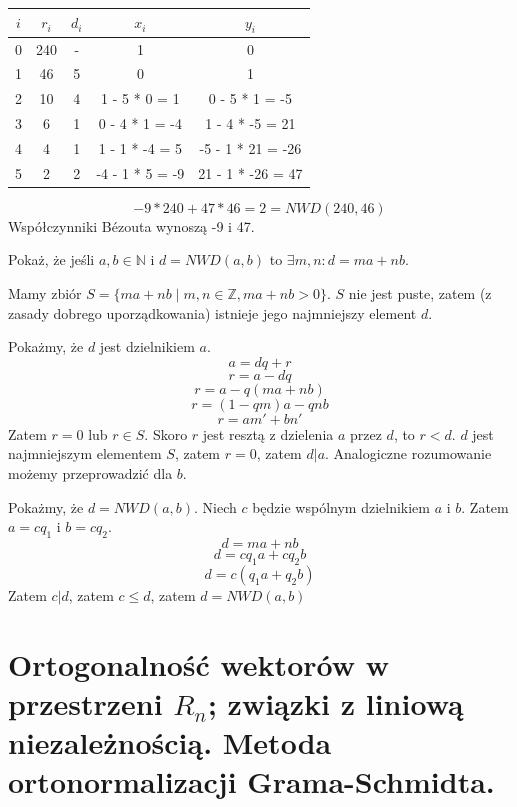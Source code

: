 \documentclass[12pt]{article}
\begin{document}
    \begin{table}[H]
    \centering
    \begin{tabular}{|c|c|c|c|c|}
    \hline
    $i$ &  $r_i$& $d_i$ &       $x_i$   &       $y_i$       \\
    \hline
    0   &   240 &   -   &       1       &       0           \\
    \hline
    1   &   46  &   5   &       0       &       1           \\
    \hline
    2   &   10  &   4   & 1 - 5 * 0 = 1 & 0 - 5 * 1 = -5    \\
    \hline
    3   &   6   &   1   & 0 - 4 * 1 = -4& 1 - 4 * -5 = 21   \\
    \hline
    4   &   4   &   1   & 1 - 1 * -4 = 5& -5 - 1 * 21 = -26 \\
    \hline
    5   &   2   &   2   &-4 - 1 * 5 = -9& 21 - 1 * -26 = 47 \\
    \hline
    
    \end{tabular}
    \end{table}
    
    $$-9 * 240 + 47 * 46 = 2 = NWD(240, 46)$$
    Współczynniki Bézouta wynoszą -9 i 47.\\
    
    \begin{exercise}
    Pokaż, że jeśli $a, b \in \mathbb{N}$ i $d = NWD(a, b)$ to $\exists m, n : d = ma + nb$.
    \end{exercise}
    
    Mamy zbiór $S = \{ma + nb \; | \; m, n \in \mathbb{Z}, ma + nb > 0\}$. $S$ nie jest puste, zatem (z zasady dobrego uporządkowania) istnieje jego najmniejszy element $d$.
    
    Pokażmy, że $d$ jest dzielnikiem $a$.
    $$a = dq + r$$
    $$r = a - dq$$
    $$r = a - q(ma + nb)$$
    $$r = (1 - qm)a - qnb$$
    $$r = am' + bn'$$
    Zatem $r = 0$ lub $r \in S$. Skoro $r$ jest resztą z dzielenia $a$ przez $d$, to $r < d$. $d$ jest najmniejszym elementem $S$, zatem $r = 0$, zatem $d | a$. Analogiczne rozumowanie możemy przeprowadzić dla $b$.
    
    Pokażmy, że $d = NWD(a, b)$. Niech $c$ będzie wspólnym dzielnikiem $a$ i $b$. Zatem $a = cq_1$ i $b = cq_2$.
    $$d = ma + nb$$
    $$d = cq_1a + cq_2b$$
    $$d = c(q_1a + q_2b)$$
    Zatem $c | d$, zatem $c \leq d$, zatem $d = NWD(a, b)$
    
\section{Ortogonalność wektorów w przestrzeni $R_n$; związki z liniową niezależnością. Metoda ortonormalizacji Grama-Schmidta.}
\end{document}
